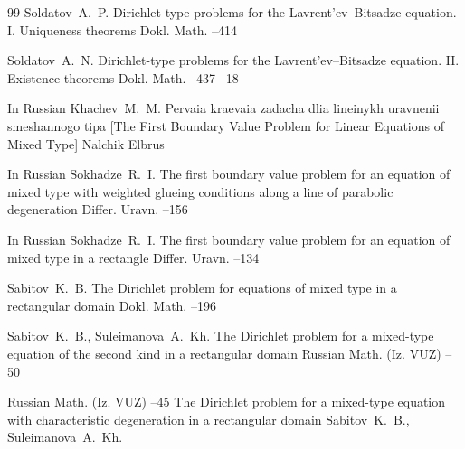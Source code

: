 \begin{thebibliography}{99}
\by Soldatov~A.~P.
\paper Dirichlet-type problems for the Lavrent'ev--Bitsadze equation. I. Uniqueness theorems
\jour Dokl. Math.
--414

\by Soldatov~A.~N.
\paper Dirichlet-type problems for the Lavrent'ev--Bitsadze equation. II. Existence theorems
\jour Dokl. Math.
--437
--18

\lang In Russian
\by Khachev~M.~M.
\book Pervaia kraevaia zadacha dlia lineinykh uravnenii smeshannogo tipa \rm [The First Boundary Value Problem for Linear Equations of Mixed Type]
\publaddr Nalchik
\publ Elbrus


\lang In Russian
\by Sokhadze~R.~I.
\paper The first boundary value problem for an equation of mixed type with weighted glueing conditions along a line of parabolic degeneration
\jour Differ. Uravn.
--156


\lang In Russian
\by Sokhadze~R.~I.
\paper The first boundary value problem for an equation of mixed type in a rectangle
\jour Differ. Uravn.
--134




\by Sabitov~K.~B.
\paper The Dirichlet problem for equations of mixed type in a rectangular domain
\jour Dokl. Math. 
–196 

\by  Sabitov~K.~B.,  Suleimanova~A.~Kh.
The Dirichlet problem for a mixed-type equation of the second kind in a rectangular domain
\jour Russian Math. (Iz. VUZ)
--50

\jour Russian Math. (Iz. VUZ)
--45
\paper The Dirichlet problem for a mixed-type equation with characteristic degeneration in a rectangular domain
\by  Sabitov~K.~B.,  Suleimanova~A.~Kh.



\end{thebibliography}
